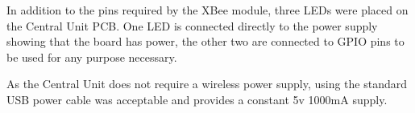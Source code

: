 In addition to the pins required by the XBee module, three LEDs were placed on the Central Unit PCB. One LED is connected directly to the power supply showing that the board has power, the other two are connected to GPIO pins to be used for any purpose necessary.

As the Central Unit does not require a wireless power supply, using the standard USB power cable was acceptable and provides a constant 5v 1000mA supply.
